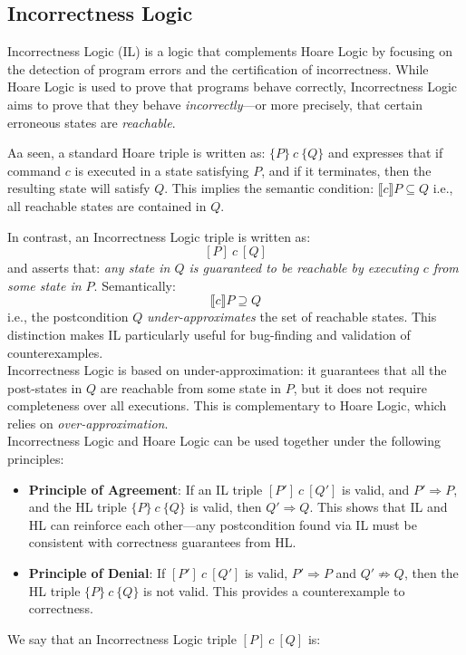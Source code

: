 \documentclass[parskip=half]{scrartcl}
\begin{document}
\subsection{Incorrectness Logic}

Incorrectness Logic (IL) is a logic that complements Hoare Logic by focusing on the detection of program errors and the certification of incorrectness. While Hoare Logic is used to prove that programs behave correctly, Incorrectness Logic aims to prove that they behave \emph{incorrectly}—or more precisely, that certain erroneous states are \emph{reachable}.

Aa seen, a standard Hoare triple is written as: $\{P\}~c~\{Q\}$ and expresses that if command $c$ is executed in a state satisfying $P$, and if it terminates, then the resulting state will satisfy $Q$. This implies the semantic condition: $\llbracket c \rrbracket P \subseteq Q$
i.e., all reachable states are contained in $Q$.

In contrast, an Incorrectness Logic triple is written as:
\[
[P]~c~[Q]
\]
and asserts that: \emph{any state in $Q$ is guaranteed to be reachable by executing $c$ from some state in $P$}. Semantically:
\[
\llbracket c \rrbracket P \supseteq Q
\]
i.e., the postcondition $Q$ \emph{under-approximates} the set of reachable states. This distinction makes IL particularly useful for bug-finding and validation of counterexamples.
\\Incorrectness Logic is based on \textbf{}{under-approximation}: it guarantees that all the post-states in $Q$ are reachable from some state in $P$, but it does not require completeness over all executions. This is complementary to Hoare Logic, which relies on \emph{over-approximation}.
\\ Incorrectness Logic and Hoare Logic can be used together under the following principles:

\begin{itemize}
  \item \textbf{Principle of Agreement}: If an IL triple $[P']~c~[Q']$ is valid, and $P' \Rightarrow P$, and the HL triple $\{P\}~c~\{Q\}$ is valid, then $Q' \Rightarrow Q$. This shows that IL and HL can reinforce each other—any postcondition found via IL must be consistent with correctness guarantees from HL.
  \item \textbf{Principle of Denial}: If $[P']~c~[Q']$ is valid, $P' \Rightarrow P$ and $Q' \not\Rightarrow Q$, then the HL triple $\{P\}~c~\{Q\}$ is not valid. This provides a counterexample to correctness.
\end{itemize}
We say that an Incorrectness Logic triple $[P]~c~[Q]$ is:
\end{document}
